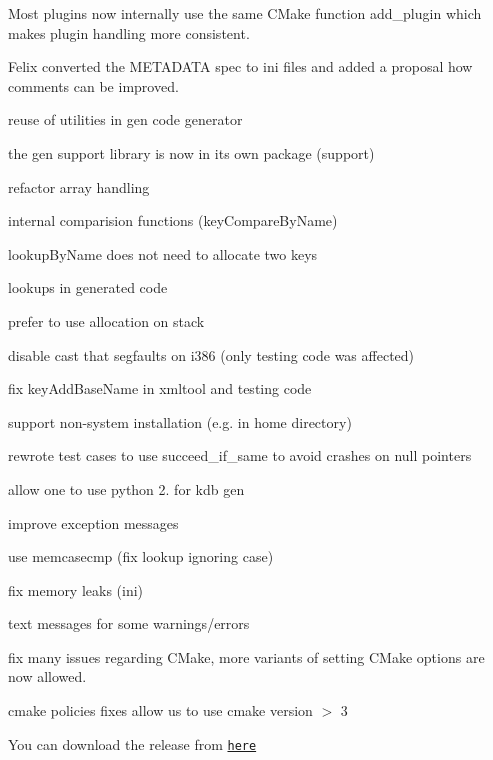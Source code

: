 Most plugins now internally use the same C\+Make function {\ttfamily add\+\_\+plugin} which makes plugin handling more consistent.

Felix converted the M\+E\+T\+A\+D\+A\+TA spec to ini files and added a proposal how comments can be improved.


\begin{DoxyItemize}
\item reuse of utilities in gen code generator
\item the gen support library is now in its own package ({\ttfamily support})
\item refactor array handling
\item internal comparision functions (key\+Compare\+By\+Name)
\end{DoxyItemize}


\begin{DoxyItemize}
\item lookup\+By\+Name does not need to allocate two keys
\item lookups in generated code
\item prefer to use allocation on stack
\end{DoxyItemize}


\begin{DoxyItemize}
\item disable cast that segfaults on i386 (only testing code was affected)
\item fix key\+Add\+Base\+Name in xmltool and testing code
\item support non-\/system installation (e.\+g. in home directory)
\item rewrote test cases to use succeed\+\_\+if\+\_\+same to avoid crashes on null pointers
\item allow one to use python 2. for kdb gen
\item improve exception messages
\item use memcasecmp (fix lookup ignoring case)
\item fix memory leaks (ini)
\item text messages for some warnings/errors
\item fix many issues regarding C\+Make, more variants of setting C\+Make options are now allowed.
\item cmake policies fixes allow us to use cmake version $>$ 3
\end{DoxyItemize}

You can download the release from \href{http://www.markus-raab.org/ftp/elektra/releases/elektra-0.8.9.tar.gz}{\tt here}


